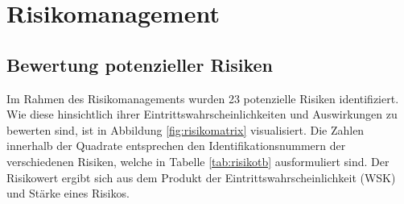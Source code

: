 \begin{flushleft}
\end{flushleft}

\chapter{Risikomanagement}
\label{chapt:Risikomanagement}
\label{chapter:6}
\section{Bewertung potenzieller Risiken}

Im Rahmen des Risikomanagements wurden 23 potenzielle Risiken identifiziert. Wie diese hinsichtlich ihrer Eintrittswahrscheinlichkeiten und Auswirkungen zu bewerten sind, ist in Abbildung \ref{fig:risikomatrix} visualisiert. Die Zahlen innerhalb der Quadrate entsprechen den Identifikationsnummern der verschiedenen Risiken, welche in Tabelle \ref{tab:risikotb} ausformuliert sind. Der Risikowert ergibt sich aus dem Produkt der Eintrittswahrscheinlichkeit (WSK) und Stärke eines Risikos. 

